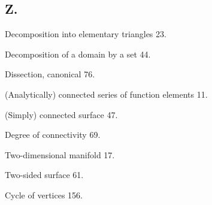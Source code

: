 \documentclass{article}
\begin{document}
\subsection*{Z.}

Decomposition into elementary triangles 23.

Decomposition of a domain by a set 44.

Dissection, canonical 76.

(Analytically) connected series of function elements 11.

(Simply) connected surface 47.

Degree of connectivity 69.

Two-dimensional manifold 17.

Two-sided surface 61.

Cycle of vertices 156.
\end{document}
